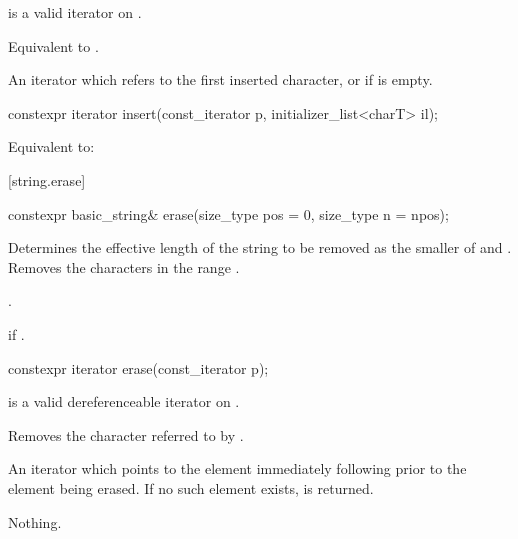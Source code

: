 \begin{itemdescr}
\pnum
\expects
{} is a valid iterator on .

\pnum
\effects
Equivalent to
.

\pnum
\returns
An iterator which refers to the first inserted character, or
 if  is empty.
\end{itemdescr}

%
\begin{itemdecl}
constexpr iterator insert(const_iterator p, initializer_list<charT> il);
\end{itemdecl}

\begin{itemdescr}
\pnum
\effects
Equivalent to: 
\end{itemdescr}

[string.erase]{}

%
\begin{itemdecl}
constexpr basic_string& erase(size_type pos = 0, size_type n = npos);
\end{itemdecl}

\begin{itemdescr}
\pnum
\effects
Determines the effective length 
of the string to be removed as the smaller of  and
.
Removes the characters in the range .

\pnum
\returns
{}.

\pnum
\throws
{}
if 
.
\end{itemdescr}

%
\begin{itemdecl}
constexpr iterator erase(const_iterator p);
\end{itemdecl}

\begin{itemdescr}
\pnum
\expects
{} is a valid dereferenceable iterator on .

\pnum
\effects
Removes the character referred to by .

\pnum
\returns
An iterator which points to the element immediately following  prior to
the element being erased.
If no such element exists,
is returned.

\pnum
\throws
Nothing.
\end{itemdescr}

